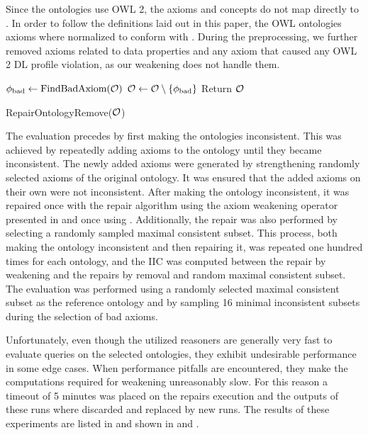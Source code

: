 \documentclass[
]{ceurart}
\begin{document}
Since the ontologies use OWL 2, the axioms and concepts do not map directly to \SROIQ. In order to follow the definitions laid out in this paper, the OWL ontologies axioms where normalized to conform with \SROIQ. During the preprocessing, we further removed axioms related to data properties and any axiom that caused any OWL 2 DL profile violation, as our weakening does not handle them.

\begin{algorithm}[t]
  \begin{algorithmic}
      \State $\phi_\textnormal{bad} \gets \textnormal{FindBadAxiom}(\mathcal{O})$
      \State $\mathcal{O} \gets \mathcal{O} \setminus \{\phi_\textnormal{bad}\}$
    \EndWhile
    \State Return $\mathcal{O}$
  \end{algorithmic}
  \caption{RepairOntologyRemove($\mathcal{O}$)}
	\label{algo:repair-remove}
\end{algorithm}

The evaluation precedes by first making the ontologies inconsistent. This was achieved by repeatedly adding axioms to the ontology until they became inconsistent. The newly added axioms were generated by strengthening randomly selected axioms of the original ontology. It was ensured that the added axioms on their own were not inconsistent. After making the ontology inconsistent, it was repaired once with the repair algorithm using the axiom weakening operator presented in  and once using . Additionally, the repair was also performed by selecting a randomly sampled maximal consistent subset. This process, both making the ontology inconsistent and then repairing it, was repeated one hundred times for each ontology, and the IIC was computed between the repair by weakening and the repairs by removal and random maximal consistent subset. The evaluation was performed using a randomly selected maximal consistent subset as the reference ontology and by sampling 16 minimal inconsistent subsets during the selection of bad axioms.

Unfortunately, even though the utilized reasoners are generally very fast to evaluate queries on the selected ontologies, they exhibit undesirable performance in some edge cases. When performance pitfalls are encountered, they make the computations required for weakening unreasonably slow. For this reason a timeout of 5 minutes was placed on the repairs execution and the outputs of these runs where discarded and replaced by new runs. The results of these experiments are listed in  and shown in  and .
\end{document}
